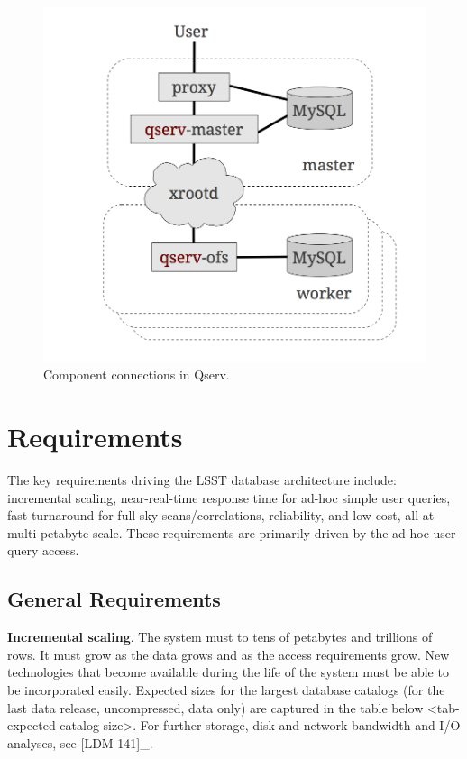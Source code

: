 \documentclass[DM,lsstdraft,toc]{lsstdoc}
\begin{document}
\begin{figure}[H]
\centering
\includegraphics{_static/qserve_components.png}
\caption{Component connections in Qserv.}
\end{figure}

\section{Requirements}\label{requirements}

The key requirements driving the LSST database architecture include:
incremental scaling, near-real-time response time for ad-hoc simple user
queries, fast turnaround for full-sky scans/correlations, reliability,
and low cost, all at multi-petabyte scale. These requirements are
primarily driven by the ad-hoc user query access.

\subsection{General Requirements}\label{general-requirements}

\textbf{Incremental scaling}. The system must to tens of petabytes and
trillions of rows. It must grow as the data grows and as the access
requirements grow. New technologies that become available during the
life of the system must be able to be incorporated easily. Expected
sizes for the largest database catalogs (for the last data release,
uncompressed, data only) are captured in
the table below \textless{}tab-expected-catalog-size\textgreater{}. For
further storage, disk and network bandwidth and I/O analyses, see
{[}LDM-141{]}\_.
\end{document}
